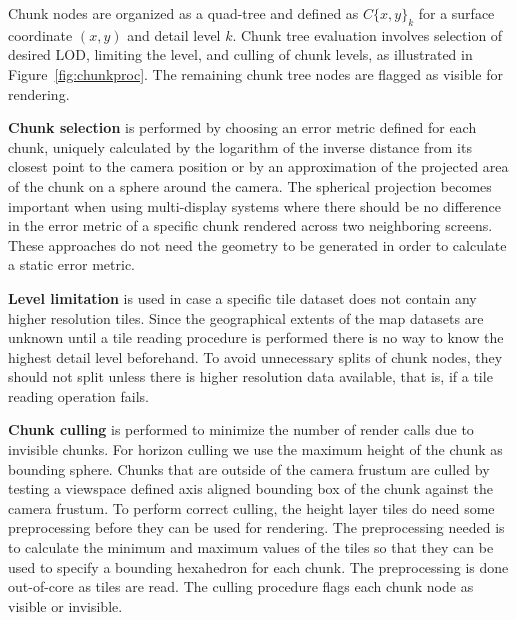 \documentclass[journal]{vgtc}                %
\newcommand{\fig}[1]{Figure~\ref{fig:#1}}
\begin{document}

Chunk nodes are organized as a quad-tree and defined as $C\{x, y\}_k$ for a surface coordinate $\left( x,y \right)$ and detail level $k$.
Chunk tree evaluation involves selection of desired LOD, limiting the level, and culling of chunk levels, as illustrated in \fig{chunkproc}.
The remaining chunk tree nodes are flagged as visible for rendering.



\textbf{Chunk selection} is performed by choosing an error metric defined for each chunk, uniquely calculated by the logarithm of the inverse distance from its closest point to the camera position or by an approximation of the projected area of the chunk on a sphere around the camera.
The spherical projection becomes important when using multi-display systems where there should be no difference in the error metric of a specific chunk rendered across two neighboring screens.
These approaches do not need the geometry to be generated in order to calculate a static error metric.

\textbf{Level limitation} is used in case a specific tile dataset does not contain any higher resolution tiles.
Since the geographical extents of the map datasets are unknown until a tile reading procedure is performed there is no way to know the highest detail level beforehand.
To avoid unnecessary splits of chunk nodes, they should not split unless there is higher resolution data available, that is, if a tile reading operation fails.

\textbf{Chunk culling} is performed to minimize the number of render calls due to invisible chunks.
For horizon culling we use the maximum height of the chunk as bounding sphere.
Chunks that are outside of the camera frustum are culled by testing a viewspace defined axis aligned bounding box of the chunk against the camera frustum.
To perform correct culling, the height layer tiles do need some preprocessing before they can be used for rendering. The preprocessing needed is to calculate the minimum and maximum values of the tiles so that they can be used to specify a bounding hexahedron for each chunk.
The preprocessing is done out-of-core as tiles are read.
The culling procedure flags each chunk node as visible or invisible.
\end{document}
